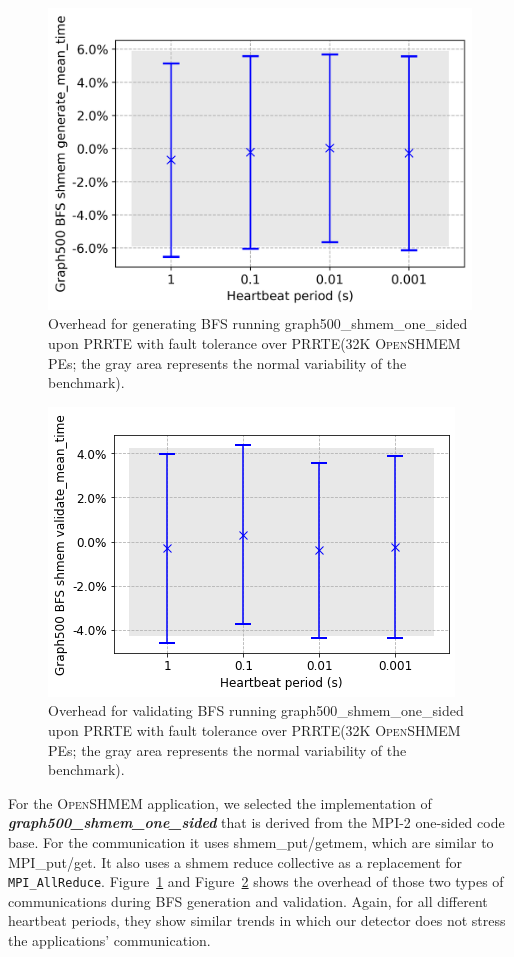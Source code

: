\documentclass[5p,times,twocolumn]{elsarticle}
\newcommand{\mpifunc}[1]{\lstinline"MPI_#1"\xspace}
\newcommand{\prrte}[0]{\textsc{PRRTE}\xspace}
\newcommand{\mpi}[0]{\textsc{MPI}\xspace}
\newcommand{\oshmem}[0]{\textsc{OpenSHMEM}\xspace}
\begin{document}
\begin{figure}[h]
  \centering
    \includegraphics[width=\linewidth]{new_shmem_bfs_mean.png}
  \caption{Overhead for generating BFS running graph500\_shmem\_one\_sided upon \prrte with fault tolerance over \prrte (32K \oshmem PEs; the gray area represents the normal variability of the benchmark).}
  \label{fig:shmem.mean.bfs}
\end{figure}

\begin{figure}[h]
  \centering
  \includegraphics[width=\linewidth]{new_shmem_validate_bfs.png}
  \caption{Overhead for validating BFS running graph500\_shmem\_one\_sided upon \prrte with fault tolerance over \prrte (32K \oshmem PEs; the gray area represents the normal variability of the benchmark).}
  \label{fig:shmem.validate.bfs}
\end{figure}
For the \oshmem application, we selected the implementation of \textbf{\emph{graph500\_shmem\_one\_sided}} that
is derived from the \mpi-2 one-sided code base.
For the communication it uses shmem\_put/getmem, which are similar to MPI\_put/get. It also uses a shmem reduce collective as a replacement for \mpifunc{AllReduce}.
Figure~\ref{fig:shmem.mean.bfs} and Figure~\ref{fig:shmem.validate.bfs} shows the overhead of
those two types of communications during BFS generation and validation.
Again, for all different heartbeat periods, they show similar trends in which our detector does not stress the applications' communication.
\end{document}
